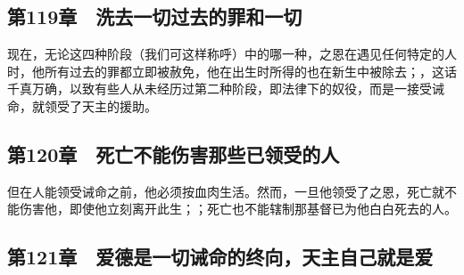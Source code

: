 
\subsection{第119章　洗去一切过去的罪和一切}

现在，无论这四种阶段（我们可这样称呼）中的哪一种，之恩在遇见任何特定的人时，他所有过去的罪都立即被赦免，他在出生时所得的也在新生中被除去；，这话千真万确，以致有些人从未经历过第二种阶段，即法律下的奴役，而是一接受诫命，就领受了天主的援助。\par


\subsection{第120章　死亡不能伤害那些已领受的人}

但在人能领受诫命之前，他必须按血肉生活。然而，一旦他领受了之恩，死亡就不能伤害他，即使他立刻离开此生；；死亡也不能辖制那基督已为他白白死去的人。\par


\subsection{第121章　爱德是一切诫命的终向，天主自己就是爱}

